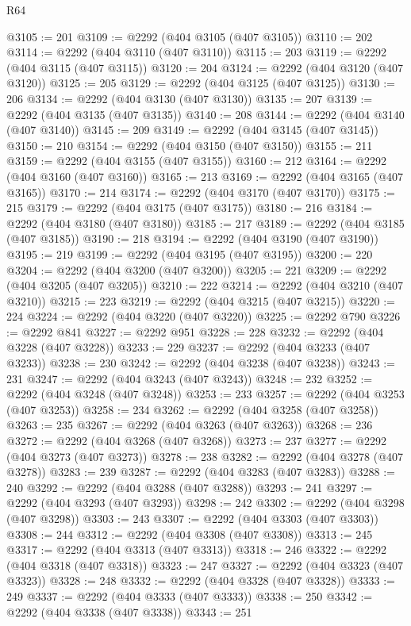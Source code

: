 \begin{lexlean}{R64}
\begin{coremodule}
@3105 := 201
@3109 := @2292 (@404 @3105 (@407 @3105))
@3110 := 202
@3114 := @2292 (@404 @3110 (@407 @3110))
@3115 := 203
@3119 := @2292 (@404 @3115 (@407 @3115))
@3120 := 204
@3124 := @2292 (@404 @3120 (@407 @3120))
@3125 := 205
@3129 := @2292 (@404 @3125 (@407 @3125))
@3130 := 206
@3134 := @2292 (@404 @3130 (@407 @3130))
@3135 := 207
@3139 := @2292 (@404 @3135 (@407 @3135))
@3140 := 208
@3144 := @2292 (@404 @3140 (@407 @3140))
@3145 := 209
@3149 := @2292 (@404 @3145 (@407 @3145))
@3150 := 210
@3154 := @2292 (@404 @3150 (@407 @3150))
@3155 := 211
@3159 := @2292 (@404 @3155 (@407 @3155))
@3160 := 212
@3164 := @2292 (@404 @3160 (@407 @3160))
@3165 := 213
@3169 := @2292 (@404 @3165 (@407 @3165))
@3170 := 214
@3174 := @2292 (@404 @3170 (@407 @3170))
@3175 := 215
@3179 := @2292 (@404 @3175 (@407 @3175))
@3180 := 216
@3184 := @2292 (@404 @3180 (@407 @3180))
@3185 := 217
@3189 := @2292 (@404 @3185 (@407 @3185))
@3190 := 218
@3194 := @2292 (@404 @3190 (@407 @3190))
@3195 := 219
@3199 := @2292 (@404 @3195 (@407 @3195))
@3200 := 220
@3204 := @2292 (@404 @3200 (@407 @3200))
@3205 := 221
@3209 := @2292 (@404 @3205 (@407 @3205))
@3210 := 222
@3214 := @2292 (@404 @3210 (@407 @3210))
@3215 := 223
@3219 := @2292 (@404 @3215 (@407 @3215))
@3220 := 224
@3224 := @2292 (@404 @3220 (@407 @3220))
@3225 := @2292 @790
@3226 := @2292 @841
@3227 := @2292 @951
@3228 := 228
@3232 := @2292 (@404 @3228 (@407 @3228))
@3233 := 229
@3237 := @2292 (@404 @3233 (@407 @3233))
@3238 := 230
@3242 := @2292 (@404 @3238 (@407 @3238))
@3243 := 231
@3247 := @2292 (@404 @3243 (@407 @3243))
@3248 := 232
@3252 := @2292 (@404 @3248 (@407 @3248))
@3253 := 233
@3257 := @2292 (@404 @3253 (@407 @3253))
@3258 := 234
@3262 := @2292 (@404 @3258 (@407 @3258))
@3263 := 235
@3267 := @2292 (@404 @3263 (@407 @3263))
@3268 := 236
@3272 := @2292 (@404 @3268 (@407 @3268))
@3273 := 237
@3277 := @2292 (@404 @3273 (@407 @3273))
@3278 := 238
@3282 := @2292 (@404 @3278 (@407 @3278))
@3283 := 239
@3287 := @2292 (@404 @3283 (@407 @3283))
@3288 := 240
@3292 := @2292 (@404 @3288 (@407 @3288))
@3293 := 241
@3297 := @2292 (@404 @3293 (@407 @3293))
@3298 := 242
@3302 := @2292 (@404 @3298 (@407 @3298))
@3303 := 243
@3307 := @2292 (@404 @3303 (@407 @3303))
@3308 := 244
@3312 := @2292 (@404 @3308 (@407 @3308))
@3313 := 245
@3317 := @2292 (@404 @3313 (@407 @3313))
@3318 := 246
@3322 := @2292 (@404 @3318 (@407 @3318))
@3323 := 247
@3327 := @2292 (@404 @3323 (@407 @3323))
@3328 := 248
@3332 := @2292 (@404 @3328 (@407 @3328))
@3333 := 249
@3337 := @2292 (@404 @3333 (@407 @3333))
@3338 := 250
@3342 := @2292 (@404 @3338 (@407 @3338))
@3343 := 251

\end{coremodule}
\end{lexlean}
